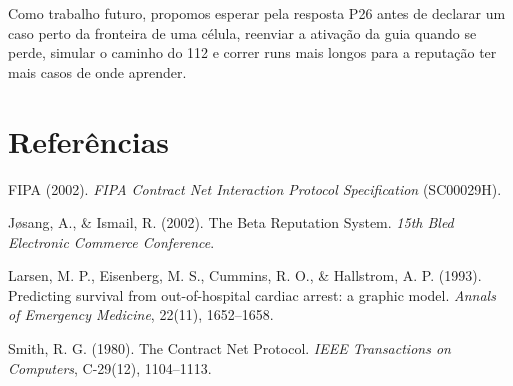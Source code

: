 \documentclass[11pt,a4paper]{article}
\begin{document}
Como trabalho futuro, propomos esperar pela resposta P26 antes de declarar um caso perto da fronteira de uma célula, reenviar a ativação da guia quando se perde, simular o caminho do 112 e correr runs mais longos para a reputação ter mais casos de onde aprender.

\section*{Referências}

\begin{list}{}{\setlength{\leftmargin}{1.5em}\setlength{\itemindent}{-1.5em}}
\item FIPA (2002). \emph{FIPA Contract Net Interaction Protocol Specification} (SC00029H).
\item Jøsang, A., \& Ismail, R. (2002). The Beta Reputation System. \emph{15th Bled Electronic Commerce Conference}.
\item Larsen, M. P., Eisenberg, M. S., Cummins, R. O., \& Hallstrom, A. P. (1993). Predicting survival from out-of-hospital cardiac arrest: a graphic model. \emph{Annals of Emergency Medicine}, 22(11), 1652--1658.
\item Smith, R. G. (1980). The Contract Net Protocol. \emph{IEEE Transactions on Computers}, C-29(12), 1104--1113.
\end{list}
\end{document}
